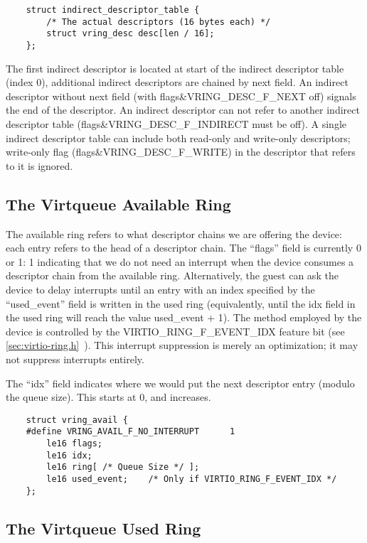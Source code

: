 \begin{lstlisting}
	struct indirect_descriptor_table {
		/* The actual descriptors (16 bytes each) */
		struct vring_desc desc[len / 16];
	};
\end{lstlisting}

The first indirect descriptor is located at start of the indirect
descriptor table (index 0), additional indirect descriptors are
chained by next field. An indirect descriptor without next field
(with flags\&VRING_DESC_F_NEXT off) signals the end of the descriptor.
An
indirect descriptor can not refer to another indirect descriptor
table (flags\&VRING_DESC_F_INDIRECT must be off). A single indirect descriptor
table can include both read-only and write-only descriptors;
write-only flag (flags\&VRING_DESC_F_WRITE) in the descriptor that refers to it
is ignored.

\subsection{The Virtqueue Available Ring}\label{sec:Basic Facilities of a Virtio Device / Virtqueues / The Virtqueue Available Ring}

The available ring refers to what descriptor chains we are offering the
device: each entry refers to the head of a descriptor chain. The “flags” field
is currently 0 or 1: 1 indicating that we do not need an interrupt
when the device consumes a descriptor chain from the available
ring. Alternatively, the guest can ask the device to delay interrupts
until an entry with an index specified by the “used_event” field is
written in the used ring (equivalently, until the idx field in the
used ring will reach the value used_event + 1). The method employed by
the device is controlled by the VIRTIO_RING_F_EVENT_IDX feature bit
(see \ref{sec:virtio-ring.h}~). This interrupt suppression is
merely an optimization; it may not suppress interrupts entirely.

The “idx” field indicates where we would put the next descriptor
entry (modulo the queue size). This starts at 0, and increases.

\begin{lstlisting}
	struct vring_avail {
	#define VRING_AVAIL_F_NO_INTERRUPT      1
		le16 flags;
		le16 idx;
		le16 ring[ /* Queue Size */ ];
		le16 used_event;	/* Only if VIRTIO_RING_F_EVENT_IDX */
	};
\end{lstlisting}

\subsection{The Virtqueue Used Ring}\label{sec:Basic Facilities of a Virtio Device / Virtqueues / The Virtqueue Used Ring}


